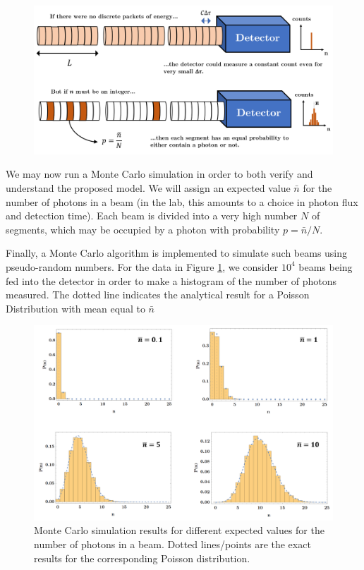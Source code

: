 \documentclass[12pt,a4paper]{report}
\begin{document}
\begin{figure}[H]
    \centering
    \includegraphics[width=1\linewidth]{detector.statistics.png}
    \caption*{}
\end{figure}

We may now run a Monte Carlo simulation in order to both verify and understand the proposed model. We will assign an expected value $\bar{n}$ for the number of photons in a beam (in the lab, this amounts to a choice in photon flux and detection time). Each beam is divided into a very high number $N$ of segments, which may be occupied by a photon with probability $p=\bar{n}/N$.

Finally, a Monte Carlo algorithm is implemented to simulate such beams using pseudo-random numbers. For the data in Figure \ref{poisson.detection}, we consider $10^4$ beams being fed into the detector in order to make a histogram of the number of photons measured. The dotted line indicates the analytical result for a Poisson Distribution with mean equal to $\bar{n}$

\begin{figure}[H]
    \centering
    \includegraphics[width=1\linewidth]{poisson.detection.png}
    \caption{Monte Carlo simulation results for different expected values for the number of photons in a beam. Dotted lines/points are the exact results for the corresponding Poisson distribution.}
    \label{poisson.detection}
\end{figure}
\end{document}
